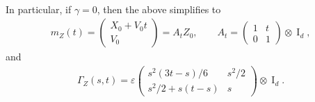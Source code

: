 \documentclass[10pt,a4paper]{amsart}
\newcommand{\Idd}{\operatorname{I}_d}
\begin{document}
\begin{lemma}
\begin{align*}
\end{align*}
In particular, if $\gamma = 0$, then the above simplifies to
  \begin{align*}
    m_Z(t) = \begin{pmatrix}
        X_0 + V_0 t \\
        V_0
    \end{pmatrix}
    = A_t Z_0, \qquad A_t =
    \begin{pmatrix}
        1 & t \\
        0 & 1
    \end{pmatrix} \otimes \Idd,
\end{align*}
and
\begin{align*}
    \Gamma_Z(s,t) =
\varepsilon     \begin{pmatrix}
  s^2(3t-s)/6 & s^2/2\\
  s^2/2 +s(t-s) & s
    \end{pmatrix}
    \otimes \Idd.
\end{align*}
\end{lemma}
\end{document}
